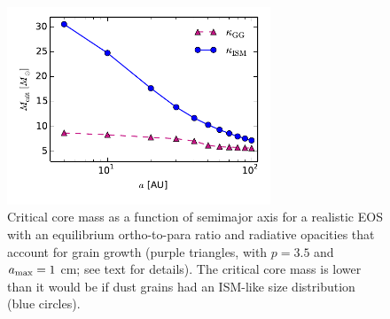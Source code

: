 









\begin{figure}[H]
\centering
\includegraphics[width=0.7\textwidth]{figures/Mcrit_vs_a_gg.pdf}
\caption{Critical core mass as a function of semimajor axis for a realistic EOS with an equilibrium ortho-to-para ratio and radiative opacities that account for grain growth (purple triangles, with $p=3.5$ and $a_{\rm max}=1$ cm; see text for details). The critical core mass is lower than it would be if dust grains had an ISM-like size distribution (blue circles).}
\label{fig:Mcritvsagg}
\end{figure}



